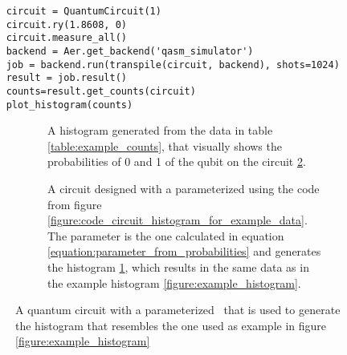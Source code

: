 \begin{listing}[!ht]
    \centering
    \begin{verbatim}
    circuit = QuantumCircuit(1)
    circuit.ry(1.8608, 0)
    circuit.measure_all()
    backend = Aer.get_backend('qasm_simulator')
    job = backend.run(transpile(circuit, backend), shots=1024)
    result = job.result()
    counts=result.get_counts(circuit)
    plot_histogram(counts)
    \end{verbatim}
    \caption{ code using  to create the circuit represented in figure \ref{figure:circuit_for_histogram}, that is executed and results in the histogram \ref{figure:circuit_histogram}}
    \label{figure:code_circuit_histogram_for_example_data}
\end{listing}

\begin{figure}[!h]
    \begin{subfigure}{.5\textwidth}
        \centering
        \scalebox{\histogramwidth}{
            
        }
        \caption{A histogram generated from the data in table \ref{table:example_counts}, that visually shows the probabilities of 0 and 1 of the qubit on the circuit \ref{figure:circuit_for_histogram}.}
        \label{figure:circuit_histogram}
    \end{subfigure}
    \begin{subfigure}{.5\textwidth}
        \centering
        \caption{A circuit designed with a parameterized \rygate using the code from figure \ref{figure:code_circuit_histogram_for_example_data}. The parameter is the one calculated in equation \ref{equation:parameter_from_probabilities} and generates the histogram \ref{figure:circuit_histogram}, which results in the same data as in the example histogram \ref{figure:example_histogram}.}
        \label{figure:circuit_for_histogram}
    \end{subfigure}
    \caption{A quantum circuit with a parameterized \rygate\ that is used to generate the histogram that resembles the one used as example in figure \ref{figure:example_histogram}}
    \label{figure:figure_circuit_histogram_rebuilt_from_example}
\end{figure}

